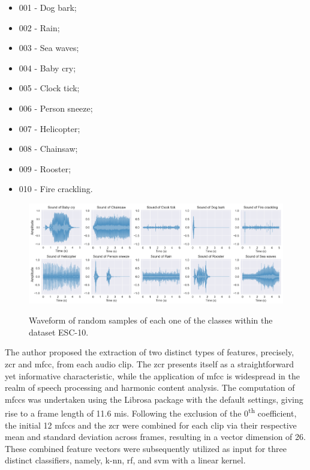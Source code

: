 \begin{itemize}
    \item 001 - Dog bark;
    \item 002 - Rain;
    \item 003 - Sea waves;
    \item 004 - Baby cry;
    \item 005 - Clock tick;
    \item 006 - Person sneeze;
    \item 007 - Helicopter;
    \item 008 - Chainsaw;
    \item 009 - Rooster;
    \item 010 - Fire crackling.
\end{itemize}

\begin{figure}[htbp]
    \raggedright
        \caption{Waveform of random samples of each one of the classes within the dataset ESC-10.}
        \includegraphics[width=1\textwidth]{resources/images/050-methods/Methods_dataset_ESC-10.png}
        \label{fig:methods_dataset_ESC-10}
\end{figure}

The author proposed the extraction of two distinct types of features, precisely, \gls{zcr} and \gls{mfcc}, from each audio clip. The \gls{zcr} presents itself as a straightforward yet informative characteristic, while the application of \gls{mfcc} is widespread in the realm of speech processing and harmonic content analysis. The computation of \gls{mfcc}s was undertaken using the Librosa package \cite{McFee2015librosa_sw} with the default settings, giving rise to a frame length of 11.6 \gls{mi}\gls{s}. Following the exclusion of the 0\textsuperscript{th} coefficient, the initial 12 \gls{mfcc}s and the \gls{zcr} were combined for each clip via their respective mean and standard deviation across frames, resulting in a vector dimension of 26. These combined feature vectors were subsequently utilized as input for three distinct classifiers, namely, \gls{k-nn}, \gls{rf}, and \gls{svm} with a linear kernel. 


